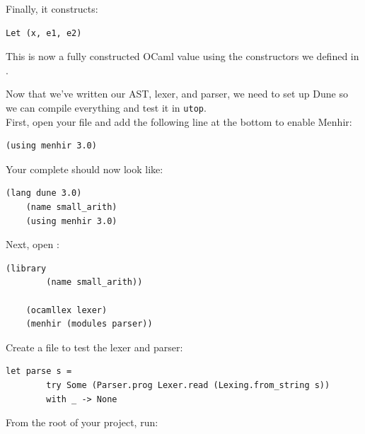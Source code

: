 \begin{Example}
    \noindent
    Finally, it constructs:
    
    \begin{lstlisting}[numbers=none]
    Let (x, e1, e2)
    \end{lstlisting}
    
    \noindent
    This is now a fully constructed OCaml value using the constructors we defined in .
    
    \end{Example}
            
    \newpage 

\begin{Example}

    Now that we've written our AST, lexer, and parser, we need to set up Dune so we can compile everything and test it in \texttt{utop}.\\
    
    \noindent
    First, open your  file and add the following line at the bottom to enable Menhir:
    
    \begin{lstlisting}[numbers=none]
    (using menhir 3.0)
    \end{lstlisting}
    
    \noindent
    Your complete  should now look like:
    
    \begin{lstlisting}[numbers=none]
    (lang dune 3.0)
    (name small_arith)
    (using menhir 3.0)
    \end{lstlisting}
    
    \noindent
    Next, open :
    
    \begin{lstlisting}[numbers=none]
    (library
        (name small_arith))
    
    (ocamllex lexer)
    (menhir (modules parser))
    \end{lstlisting}
    
    \noindent
    Create a  file to test the lexer and parser:
    \begin{lstlisting}[numbers=none]
    let parse s =
        try Some (Parser.prog Lexer.read (Lexing.from_string s))
        with _ -> None
    \end{lstlisting}
    
    \noindent
    From the root of your project, run:
    

\end{Example}
